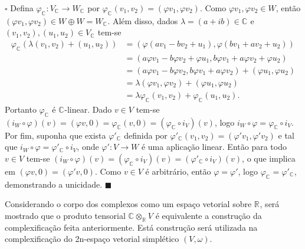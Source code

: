 \documentclass[12pt]{book}
\newenvironment{prova}[1]{$\square$ #1}{\hfill$\blacksquare$}
\newcommand{\complexificacao}[1]{#1_{\complexo{}}}
\newcommand{\complexificacaotensorial}[1]{\complexo{}\otimes_{\reta} #1}
\newcommand{\complexo}[1]{\mathbb{C}^{#1}}
\newcommand{\real}[1]{\mathbb{R}^{#1}}
\newcommand{\reta}{\real{}}
\begin{document}
	\begin{prova}
		Defina $\complexificacao{\varphi}:\complexificacao{V} \to \complexificacao{W}$ por $\complexificacao{\varphi}(v_{1}, v_{2}) = (\varphi v_{1}, \varphi v_{2})$. Como $\varphi v_{1}, \varphi v_{2} \in W$, então $(\varphi v_{1}, \varphi v_{2}) \in W\oplus W = \complexificacao{W}$. Além disso, dados $\lambda = (a+ib)\in \complexo{}$ e $(v_{1}, v_{2}), (u_{1}, u_{2})\in \complexificacao{V}$ tem-se 
		$$
		\begin{aligned}
		\complexificacao{\varphi} (\lambda(v_{1}, v_{2}) + (u_{1}, u_{2})) 
		&= (\varphi(a v_{1} - bv_{2} + u_{1}), \varphi(b v_{1}+a v_{2} + u_{2}))
		\\
		&=(a\varphi v_{1} - b\varphi v_{2} + \varphi u_{1}, b\varphi v_{1}+a\varphi v_{2} + \varphi u_{2})
		\\
		&=(a\varphi v_{1} - b\varphi v_{2} , b\varphi v_{1}+a\varphi v_{2} )+(\varphi u_{1},\varphi u_{2})
		\\
		&=\lambda(\varphi v_{1},\varphi v_{2})+(\varphi u_{1},\varphi u_{2})
		\\
		&=\lambda 	\complexificacao{\varphi} (v_{1},v_{2})+\complexificacao{\varphi} (u_{1},u_{2}).
		\end{aligned}
		$$
		Portanto $\complexificacao{\varphi}$ é $\complexo{}$-linear. Dado $v \in V$ tem-se $(i_{W}\circ \varphi)(v) = (\varphi v,0) = \complexificacao{\varphi}(v,0) = (\complexificacao{\varphi} \circ i_{V})(v)$, logo $i_{W}\circ \varphi =\complexificacao{\varphi} \circ i_{V}$. Por fim, suponha que exista $\complexificacao{\varphi'} $ definida por $\complexificacao{\varphi'}(v_{1}, v_{2}) = (\varphi' v_{1}, \varphi' v_{2})$ e tal que $i_{W}\circ \varphi =\complexificacao{\varphi'} \circ i_{V}$, onde $\varphi':V\to W$ é uma aplicação linear. Então para todo $v \in V$ tem-se $(i_{W}\circ \varphi )(v)=(\complexificacao{\varphi} \circ i_{V})(v) = (\complexificacao{\varphi'} \circ i_{V})(v)$, o que implica em $(\varphi v, 0) = (\varphi' v, 0)$. Como $v \in V$ é arbitrário, então $\varphi = \varphi'$, logo $\complexificacao{\varphi} = \complexificacao{\varphi'}$, demonstrando a unicidade. 
	\end{prova}
	
	Considerando o corpo dos complexos como um espaço vetorial sobre $\reta$, será mostrado que o produto tensorial $\complexificacaotensorial{V}$ é equivalente a construção da complexificação feita anteriormente. Está construção será utilizada na complexificação do 2n-espaço vetorial simplético $(V, \omega)$.
	
\end{document}
